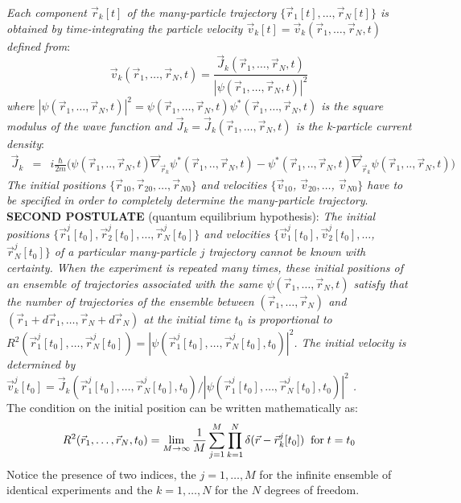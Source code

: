 \documentclass[nofootinbib, secnumarabic, amsmath, nobibnotes,11pt,aps,pra, floatfix]{revtex4-1}
\begin{document}
\textit{Each component $\vec r_k[t]$ of the many-particle trajectory  $\{\vec r_1[t],\ldots,\vec r_N[t]\}$ is obtained by time-integrating the particle velocity $\vec v_k[t] = \vec v_k(\vec r_1,\ldots,\vec r_N,t)$ defined from}:
\begin{equation}
\vec v_k(\vec r_1,\ldots,\vec r_N,t) = \frac{\vec J_k(\vec r_1,\ldots,\vec r_N,t)} {|\psi(\vec r_1,\ldots,\vec r_N,t)|^2}
\nonumber
\end{equation}
\textit{where $|\psi(\vec r_1,\ldots,\vec r_N,t)|^2 = \psi(\vec
r_1,\ldots,\vec r_N,t) \psi^*(\vec r_1,\ldots,\vec r_N,t)$ is the
square modulus of the wave function and $\vec J_k = \vec J_k(\vec
r_1,\ldots,\vec r_N,t)$ is the k-particle  current density}:
\begin{eqnarray*}
\vec J_k &=& i \frac {\hbar} {2m} \Big(\psi(\vec r_1,..,\vec r_N,t) \vec \nabla_{\vec{r}_k} {\psi^{*}(\vec r_1,..,\vec r_N,t)}-\psi^{*}(\vec r_1,..,\vec r_N,t) \vec \nabla_{\vec{r}_k} \psi(\vec r_1,..,\vec r_N,t) \Big)
\end{eqnarray*}
\textit{The initial positions $\{\vec r_{10},\vec r_{20},\ldots,\vec r_{N0}\}$ and
velocities $\{\vec v_{10}$, $\vec v_{20},\ldots$, $\vec v_{N0}\}$ have to be specified in order to completely determine the many-particle trajectory}.\\

\noindent\textbf{SECOND POSTULATE} (quantum equilibrium hypothesis): \textit{The initial positions $\{\vec r^j_{1}[t_0],\vec r^j_{2}[t_0],\ldots,\vec r^j_{N}[t_0] \}$
and velocities $\{\vec v^j_{1}[t_0],\vec v^j_{2}[t_0],\ldots$, $\vec r^j_{N}[t_0]\}$ of a particular many-particle $j$ trajectory cannot be known with certainty.
When the experiment is repeated many times, these initial positions of an ensemble of trajectories associated with the same $\psi(\vec r_1,\ldots,\vec r_N,t)$ satisfy that the number of trajectories of the ensemble between $(\vec r_1,\ldots,\vec r_N)$ and $(\vec r_1 + d\vec r_1,\ldots,\vec r_N + d \vec r_N)$ at the initial time $t_0$ is proportional to $R^2(\vec r^j_{1}[t_0],\ldots,\vec r^j_{N}[t_0]) = |\psi(\vec r^j_{1}[t_0],\ldots,\vec r^j_{N}[t_0],t_0)|^2$.
The initial velocity is determined by $\vec v_k^j[t_0] = \vec J_k(\vec r^j_{1}[t_0],\ldots,\vec r^j_{N}[t_0],  t_0)/|\psi(\vec r^j_{1}[t_0],\ldots,\vec r^j_{N}[t_0],t_0)|^2$ .}\\

The condition on the initial position can be written mathematically as:
\begin{equation}
\label{om.sum_0f_particlesNDo}
R^2(\vec r_1,\ldots,\vec r_N,t_0) = \lim_{M\rightarrow\infty} \frac {1} {M} \sum_{j = 1}^{M} \prod_{k = 1}^{N}\delta(\vec r-\vec r_{k}^j[t_0])  \; \; {\rm for}\; t = t_0
\end{equation}
Notice the presence of two indices, the $j = 1,\ldots,M$ for the infinite ensemble of identical experiments and the $k = 1,\ldots,N$ for the $N$ degrees of freedom.\\
\end{document}

